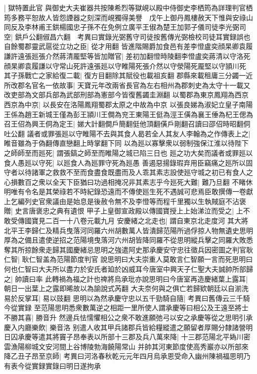 |{
	獄特置此官}
與御史大夫崔器共按陳希烈等獄峴以殿中侍御史李栖筠為詳理判官栖筠多務平恕故人皆怨諲器之刻深而峴獨得美譽　戊午上御丹鳳樓赦天下惟與安祿山同反及李林甫王鉷楊國忠子孫不在免例立廣平王俶為楚王加郭子儀司徒李光弼司空|{
	鉷戶公翻俶昌六翻　考異曰實錄光弼舊守司徒按舊傳光弼檢校司徒耳實録誤也}
自餘蜀郡靈武扈從立功之臣|{
	從才用翻}
皆進階賜爵加食邑有差李憕盧奕顔杲卿袁履謙許遠張廵張介然蔣清龎堅等皆加贈官|{
	差初加翻憕時陵翻李憕盧奕蔣清以守洛死顔杲卿袁履謙以守常山死許遠張廵以守睢陽死張介然以守滎陽死龎堅以守頴川死}
其子孫戰亡之家給復二載|{
	復方目翻除其賦役也載祖亥翻}
郡縣來載租庸三分蠲一近所改郡名官名一依故事|{
	天寶元年改兩省長官為左右相州為郡刺史為太守十一載又改吏部為文部兵部為武部刑部為憲部今皆復舊蠲圭淵翻}
以蜀郡為東京鳳翔為西京西京為中京|{
	以長安在洛陽鳳翔蜀郡太原之中故為中京}
以張良娣為淑妃立皇子南陽王係為趙王新城王僅為彭王頴川王僴為兖王東陽王侹為涇王僙為襄王倕為杞王偲為召王佋為興王侗為定王|{
	娣大計翻僴戶簡翻侹他頂翻僙戶剛翻召讀曰邵佋時昭翻侗吐公翻}
議者或罪張廵以守睢陽不去與其食人曷若全人其友人李翰為之作傳表上之|{
	睢音雖為于偽翻傳直戀翻上時掌翻下同}
以為廵以寡擊衆以弱制強保江淮以待陛下之師師至而廵死|{
	謂張鎬之師至而睢陽之城已陷三日也}
廵之功大矣而議者或罪廵以食人愚廵以守死|{
	以廵食人為廵罪守死為廵愚}
善遏惡揚錄瑕弃用臣竊痛之廵所以固守者以待諸軍之救救不至而食盡食既盡而及人乖其素志設使廵守城之初已有食人之心損數百之衆以全天下臣猶曰功過相掩况非其素志乎今廵死大難|{
	難乃旦翻}
不睹休明唯有令名是其榮祿若不時紀錄恐遠而不傳使廵生死不遇誠可悲焉臣敢撰傳一卷獻上乞編列史官衆議由是始息是後赦令無不及李憕等而程千里獨以生執賊庭不沾褒贈|{
	史言唐褒忠之典有遺恨}
甲子上皇御宣政殿以傳國寶授上上始涕泣而受之|{
	上不敢受傳國寶見二百一十八卷元載九月}
安慶緒之北走也|{
	謂自東京北走度河}
其大將北平王李歸仁及精兵曳落河同羅六州胡數萬人皆潰歸范陽所過俘掠人物無遺史思明厚為之備且遣使逆招之范陽境曳落河六州胡皆降同羅不從思明縱兵擊之同羅大敗悉奪其所掠餘衆走歸其國慶緒忌思明之強遣阿史那承慶安守忠往徵兵因密圖之判官耿仁智|{
	耿仁智盖為范陽節度判官}
說思明曰大夫崇重人莫敢言仁智願一言而死思明曰何也仁智曰大夫所以盡力於安氏者廹於凶威耳今唐室中興天子仁聖大夫誠帥所部歸之|{
	帥讀曰率}
此轉禍為福之計也禆將烏承玭亦說思明曰今唐室再造慶緒葉上露耳|{
	朝日一出葉上之露即晞故以為諭說式芮翻}
大夫奈何與之俱亡若歸欵朝廷以自湔洗易於反掌耳|{
	易以豉翻}
思明以為然承慶守忠以五千勁騎自隨|{
	考異曰舊傳云三千騎今從實録}
至范陽思明悉衆數萬逆之相距一里所使人謂承慶等曰相公及王遠至將士不勝其喜|{
	勝音升}
然邊兵怯懦懼相公之衆不敢進願弛弓以安之承慶等從之思明引承慶入内廳樂飲|{
	樂音洛}
别遣人收其甲兵諸郡兵皆給糧縱遣之願留者厚賜分隸諸營明日囚承慶等遣其將竇子昂奉表以所部十三郡及兵八萬來降|{
	十三郡范陽北平媯川密雲漁陽柳城文安河間上谷博陵勃海饒陽常山}
并帥其河東節度使高秀巖亦以所部來降乙丑子昂至京師|{
	考異曰河洛春秋乾元元年四月烏承恩受命入幽州陳禍福思明乃有表今從實録實錄曰明日遂拘承}



